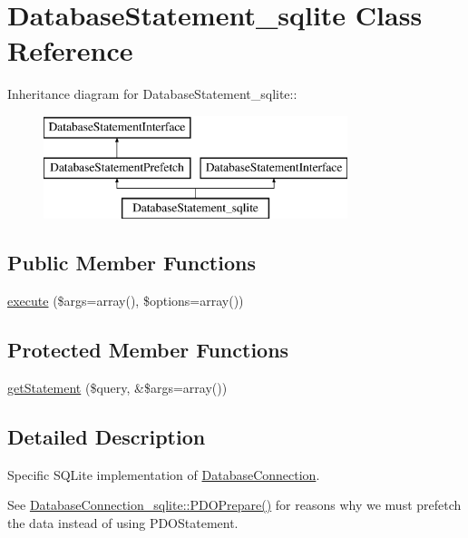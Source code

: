 \hypertarget{classDatabaseStatement__sqlite}{
\section{DatabaseStatement\_\-sqlite Class Reference}
\label{classDatabaseStatement__sqlite}
}
Inheritance diagram for DatabaseStatement\_\-sqlite::\begin{figure}[H]
\begin{center}
\leavevmode
\includegraphics[height=3cm]{classDatabaseStatement__sqlite}
\end{center}
\end{figure}
\subsection*{Public Member Functions}
\begin{DoxyCompactItemize}
\item 
\hyperlink{classDatabaseStatement__sqlite_a2b23f3a9e83efae1690475b7c6cda0a8}{execute} (\$args=array(), \$options=array())
\end{DoxyCompactItemize}
\subsection*{Protected Member Functions}
\begin{DoxyCompactItemize}
\item 
\hyperlink{classDatabaseStatement__sqlite_a2d397baba57238e6797e59e9c36943b3}{getStatement} (\$query, \&\$args=array())
\end{DoxyCompactItemize}


\subsection{Detailed Description}
Specific SQLite implementation of \hyperlink{classDatabaseConnection}{DatabaseConnection}.

See \hyperlink{classDatabaseConnection__sqlite_a8e377488ebb6c76e61590ca3f5d7245c}{DatabaseConnection\_\-sqlite::PDOPrepare()} for reasons why we must prefetch the data instead of using PDOStatement.

